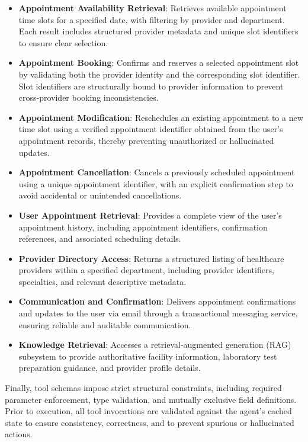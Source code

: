\documentclass[conference]{IEEEtran}
\begin{document}
\begin{itemize}
\item \textbf{Appointment Availability Retrieval}: Retrieves available appointment time slots for a specified date, with filtering by provider and department. Each result includes structured provider metadata and unique slot identifiers to ensure clear selection.
\item \textbf{Appointment Booking}: Confirms and reserves a selected appointment slot by validating both the provider identity and the corresponding slot identifier. Slot identifiers are structurally bound to provider information to prevent cross-provider booking inconsistencies.
\item \textbf{Appointment Modification}: Reschedules an existing appointment to a new time slot using a verified appointment identifier obtained from the user’s appointment records, thereby preventing unauthorized or hallucinated updates.
\item \textbf{Appointment Cancellation}: Cancels a previously scheduled appointment using a unique appointment identifier, with an explicit confirmation step to avoid accidental or unintended cancellations.
\item \textbf{User Appointment Retrieval}: Provides a complete view of the user’s appointment history, including appointment identifiers, confirmation references, and associated scheduling details.
\item \textbf{Provider Directory Access}: Returns a structured listing of healthcare providers within a specified department, including provider identifiers, specialties, and relevant descriptive metadata.
\item \textbf{Communication and Confirmation}: Delivers appointment confirmations and updates to the user via email through a transactional messaging service, ensuring reliable and auditable communication.
\item \textbf{Knowledge Retrieval}: Accesses a retrieval-augmented generation (RAG) subsystem to provide authoritative facility information, laboratory test preparation guidance, and provider profile details.
\end{itemize}

Finally, tool schemas impose strict structural constraints, including required parameter enforcement, type validation, and mutually exclusive field definitions. Prior to execution, all tool invocations are validated against the agent’s cached state to ensure consistency, correctness, and to prevent spurious or hallucinated actions.
\end{document}

